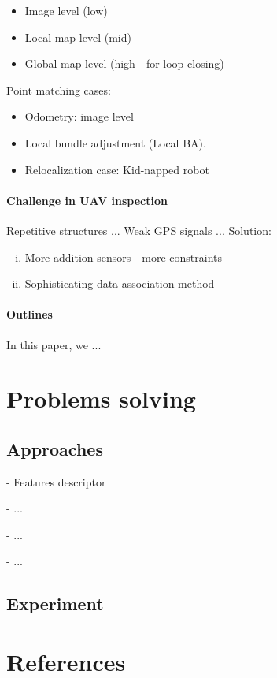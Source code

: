 \documentclass[review]{elsarticle}
\begin{document}
\begin{itemize}
	\item Image level (low)
	\item Local map level (mid)
	\item Global map level (high - for loop closing)
\end{itemize}

Point matching cases:
\begin{itemize}
	\item Odometry: image level
	\item Local bundle adjustment (Local BA).
	\item Relocalization case: Kid-napped robot
\end{itemize}

\paragraph{Challenge in UAV inspection} 
Repetitive structures ...
Weak GPS signals ...
Solution: 
\begin{enumerate}[(i)]
	\item More addition sensors - more constraints
	\item Sophisticating data association method
\end{enumerate}

\paragraph{Outlines} 
In this paper, we ...

\section{Problems solving}

\subsection{Approaches}
- Features descriptor

- ...

- ...

- ...

\subsection{Experiment}



\section*{References}

% 
\end{document}
